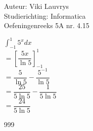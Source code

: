 \documentclass[a4paper]{article}
\begin{document}
  
\noindent \large Auteur: Viki	Lauvrys \\
\noindent \large Studierichting: Informatica\\
\noindent \large Oefeningenreeks 5A nr. 4.15\\

\medskip

\normalsize

$ \displaystyle\int^1_{-1} 5^x dx $ \\

$ = \left[ \dfrac{5x}{\ln 5} \right]^1_{-1} $ \\

$ = \dfrac{5}{\ln 5} - \dfrac{5^{-1}}{\ln 5} $ \\

$ = \dfrac{25}{5 \ln 5} - \dfrac{1}{5 \ln 5} $ \\

$ = \dfrac{24}{5 \ln 5} $ \\

\begin{thebibliography}{999}
\end{thebibliography}
\end{document}

